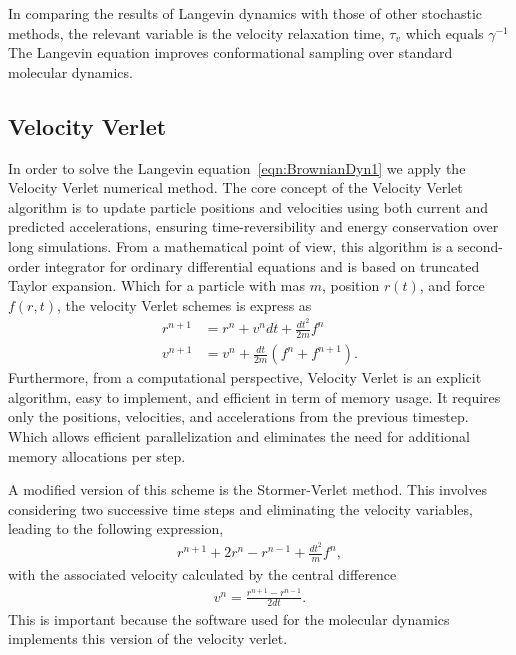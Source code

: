 In comparing the results of Langevin dynamics with those of other stochastic methods, the relevant variable is the velocity relaxation time, $\tau_{v}$ which equals $\gamma^{-1}$\citep{pastorTechniquesApplicationsLangevin1994}
The Langevin equation improves conformational sampling over standard molecular dynamics\citep{paquetMolecularDynamicsMonte2015}.


\subsection{Velocity Verlet}

In order to solve the Langevin equation~\eqref{eqn:BrownianDyn1} we apply the Velocity Verlet numerical method.
The core concept of the Velocity Verlet algorithm is to update particle positions and velocities using both current and predicted accelerations, ensuring time-reversibility and energy conservation over long simulations. 
From a mathematical point of view, this algorithm is a second-order integrator for ordinary differential equations and is based on truncated Taylor expansion.
Which for a particle with mas $m$, position $r(t)$, and force $f(r,t)$, the velocity Verlet schemes is express as
\begin{align}
    r^{n+1} &= r^n + v^n dt + \frac{dt^2}{2m}f^n \\
    v^{n+1} &= v^n + \frac{dt}{2m}(f^n+f^{n+1}).
\end{align}
Furthermore, from a computational perspective, Velocity Verlet is an explicit algorithm, easy to implement, and efficient in term of memory usage.
It requires only the positions, velocities, and accelerations from the previous timestep.
Which allows efficient parallelization and eliminates the need for additional memory allocations per step.

A modified version of this scheme is the Stormer-Verlet method. 
This involves considering two successive time steps and eliminating the velocity variables, leading to the following expression,
\begin{align}
    r^{n+1} + 2r^{n} - r^{n-1} + \frac{dt^2}{m}f^{n},
\end{align}
with the associated velocity calculated by the central difference
\begin{align}
    v^n = \frac{r^{n+1} - r^{n-1}}{2dt}.
\end{align}
This is important because the software used for the molecular dynamics implements this version of the velocity verlet.

